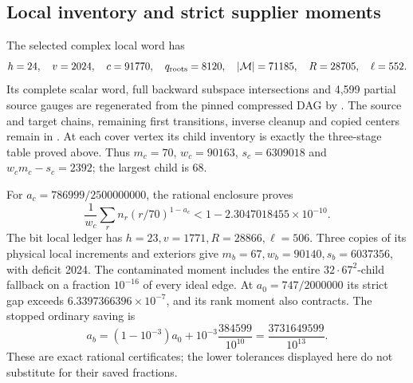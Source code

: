\subsection{Local inventory and strict supplier moments}
The selected complex local word has
\[
 h=24,\quad v=2024,\quad c=91770,\quad q_{\rm roots}=8120,
 \quad |\mathcal M|=71185,\quad R=28705,\quad\ell=552.
\]
Its complete scalar word, full backward subspace intersections and 4,599
partial source gauges are regenerated from the pinned compressed DAG by
. The source and target chains,
remaining first transitions, inverse cleanup and copied centers remain in
.
At each cover vertex its child inventory is exactly the three-stage table
proved above. Thus $m_c=70$, $w_c=90163$, $s_c=6309018$ and
$w_cm_c-s_c=2392$; the largest child is 68.

For $a_c=786999/2500000000$, the rational enclosure proves
\[
 \frac1{w_c}\sum_r n_r(r/70)^{1-a_c}
 <1-2.3047018455\times10^{-10}.
\]
The bit local ledger has $h=23,v=1771,R=28866,\ell=506$.
Three copies of its physical local increments and exteriors give
$m_b=67,w_b=90140,s_b=6037356$, with deficit 2024.
The contaminated moment includes the entire $32\cdot67^2$-child fallback
on a fraction $10^{-16}$ of every ideal edge. At $a_0=747/2000000$ its
strict gap exceeds $6.3397366396\times10^{-7}$, and its rank moment also
contracts. The stopped ordinary saving is
\[
 a_b=(1-10^{-3})a_0+10^{-3}\frac{384599}{10^{10}}
     =\frac{3731649599}{10^{13}}.
\]
These are exact rational certificates; the lower tolerances displayed
here do not substitute for their saved fractions.

